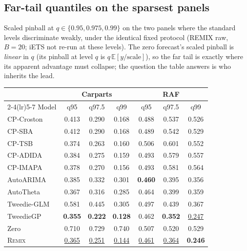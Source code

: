 \documentclass[twocolumn,10pt]{article}
\theoremstyle{definition}
\newcommand{\REMIX}{\textsc{Remix}}
\newcommand{\E}{\mathbb{E}}
\newcommand{\best}[1]{\textbf{#1}}
\newcommand{\secondbest}[1]{\underline{#1}}
\begin{document}
\subsection{Far-tail quantiles on the sparsest panels}
\label{app:fartail}

Scaled pinball at $q\in\{0.95,0.975,0.99\}$ on the two panels where the
standard levels discriminate weakly, under the identical fixed protocol
(REMIX raw, $B{=}20$; iETS not re-run at these levels). The zero
forecast's scaled pinball is \emph{linear} in $q$ (its pinball at level
$q$ is $q\,\E[y/\mathrm{scale}]$), so the far tail is exactly where its
apparent advantage must collapse; the question the table answers is who
inherits the lead.

\begin{table}[h]
\centering
\small
\setlength{\tabcolsep}{3.6pt}
\begin{tabular}{lccc@{\hspace{10pt}}ccc}
\toprule
 & \multicolumn{3}{c}{Carparts} & \multicolumn{3}{c}{RAF}\\
\cmidrule(lr){2-4}\cmidrule(lr){5-7}
Model & q95 & q97.5 & q99 & q95 & q97.5 & q99\\
\midrule
CP-Croston & 0.413 & 0.290 & 0.168 & 0.488 & 0.537 & 0.526\\
CP-SBA & 0.412 & 0.290 & 0.168 & 0.489 & 0.542 & 0.529\\
CP-TSB & 0.374 & 0.263 & 0.160 & 0.506 & 0.601 & 0.552\\
CP-ADIDA & 0.384 & 0.275 & 0.159 & 0.493 & 0.579 & 0.557\\
CP-IMAPA & 0.378 & 0.270 & 0.156 & 0.493 & 0.581 & 0.564\\
AutoARIMA & 0.385 & 0.332 & 0.301 & \best{0.460} & 0.395 & 0.356\\
AutoTheta & 0.367 & 0.316 & 0.285 & 0.464 & 0.399 & 0.359\\
Tweedie-GLM & 0.581 & 0.445 & 0.305 & 0.497 & 0.439 & 0.367\\
TweedieGP & \best{0.355} & \best{0.222} & \best{0.128} & 0.462 & \best{0.352} & \secondbest{0.247}\\
\midrule
Zero & 0.710 & 0.729 & 0.740 & 0.507 & 0.520 & 0.529\\
\midrule
\REMIX{} & \secondbest{0.365} & \secondbest{0.251} & \secondbest{0.144} & \secondbest{0.461} & \secondbest{0.364} & \best{0.246}\\
\bottomrule
\end{tabular}
\end{table}
\end{document}

